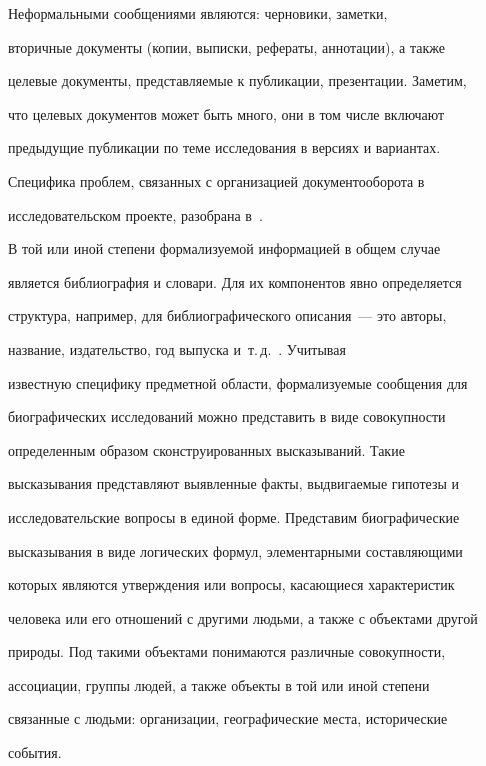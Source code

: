      Неформальными сообщениями являются: черновики, заметки, 


вторичные документы (копии, выписки, рефераты, аннотации), а также 


целевые документы, представляемые к публикации, презентации.  Заметим, 


что целевых документов может быть много, они в том числе включают 


предыдущие публикации по теме исследования в версиях и вариантах.  


Специфика проблем, связанных с организацией документооборота в 


исследовательском проекте, разобрана в~\cite{2-2-12}. 


     


     В той или иной степени формализуемой информацией в общем случае 


является библиография и словари.  Для их компонентов явно определяется 


структура, например,  для библиографического описания~--- это авторы, 


название, издательство, год выпуска и~т.\,д.~\cite{5-2-12}. Учитывая 


известную специфику предметной области, формализуемые сообщения для 


биографических исследований можно представить в виде совокупности 


определенным образом сконструированных высказываний. Такие 


высказывания представляют выявленные факты, выдвигаемые гипотезы и 


исследовательские вопросы в единой форме.  Представим биографические 


высказывания в виде логических формул, элементарными составляющими 


которых являются утверждения или вопросы, касающиеся характеристик 


человека или его отношений с другими людьми, а также с объектами другой 


природы.  Под такими объектами понимаются различные совокупности, 


ассоциации, группы людей, а также объекты в той или иной степени 


связанные с людьми: организации, географические места, исторические 


события. 


     


